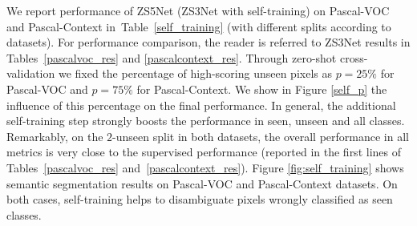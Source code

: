 \documentclass{article}
\begin{document}
We report performance of ZS5Net (ZS3Net with self-training) on Pascal-VOC and Pascal-Context in~Table~\ref{self_training} (with different splits according to datasets).
For performance comparison, the reader is referred to ZS3Net results in Tables~\ref{pascalvoc_res} and \ref{pascalcontext_res}.
Through zero-shot cross-validation we fixed the percentage of high-scoring unseen pixels as $p=25\%$ for Pascal-VOC and $p=75\%$ for Pascal-Context.
We show in Figure \ref{self_p} the influence of this percentage on the final performance. 
In general, the additional self-training step strongly boosts the performance in seen, unseen and all classes.
Remarkably, on the $2$-unseen split in both datasets, the overall performance in all metrics is very close to the supervised performance (reported in the first lines of Tables~\ref{pascalvoc_res} and~\ref{pascalcontext_res}).
Figure \ref{fig:self_training} shows semantic segmentation results on Pascal-VOC and Pascal-Context datasets. On both cases, self-training helps to disambiguate pixels wrongly classified as seen classes. 
\end{document}
